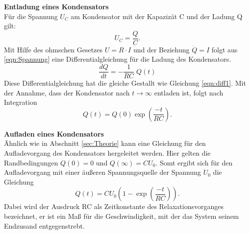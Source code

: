 \noindent \textbf{Entladung eines Kondensators}\\
\label{sec:Entladung}
Für die Spannung $U_{C}$ am Kondensator mit der Kapazizät C und der Ladung Q gilt:
\begin{equation}
  U_{C} = \frac{Q}{C}.
  \label{Spannung}
\end{equation}
Mit Hilfe des ohmschen Gesetzes $U=R\cdot I$ und der Beziehung $\dot{Q}=I$
folgt aus \eqref{eqn:Spannung} eine Differentialgleichung für die Ladung des
Kondensators.
\begin{equation}
  \frac{dQ}{dt}=- \frac{1}{RC}\; Q(t)
  \label{eqn:diff2}
\end{equation}
Diese Differentialgleichung hat die gleiche Gestallt wie Gleichung \eqref{eqn:diff1}.
Mit der Annahme, dass der Kondensator nach $t \to \infty$ entladen ist, folgt
nach Integration
\begin{equation}
  Q(t)=Q(0)\exp{\left(\frac{-t}{RC}\right)}.
  \label{eqn:entladung}
\end{equation}

\noindent \textbf{Aufladen eines Kondensators} \\
Ähnlich wie in Abschnitt \ref{sec:Theorie} kann eine Gleichung für den
Aufladevorgang des Kondensators hergeleitet werden. Hier gelten die
Randbedingungen $Q(0)=0$ und $Q(\infty)=CU_{0}$. Somt ergibt sich
für den Aufladevorgang mit einer äußeren Spannungsquelle der Spannung $U_{0}$
die Gleichung
\begin{equation}
  Q(t)=CU_{0}\left(1-\exp{\left(\frac{-t}{RC}\right)}\right).
  \label{aufladen}
\end{equation}
Dabei wird der Ausdruck RC als Zeitkonstante des Relaxationsvorganges bezeichnet,
er ist ein Maß für die Geschwindigkeit, mit der das System seinem Endzusand entgegenstrebt.\\
\\
